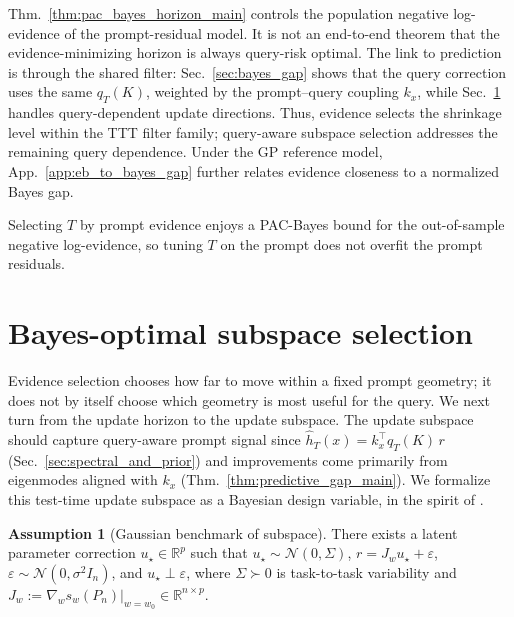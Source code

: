 \documentclass{article}
\theoremstyle{plain}
\theoremstyle{definition}
\newtheorem{assumption}[theorem]{Assumption}
\theoremstyle{remark}
\begin{document}
Thm.~\ref{thm:pac_bayes_horizon_main} controls the population negative log-evidence of the prompt-residual model. It is not an end-to-end theorem that the evidence-minimizing horizon is always query-risk optimal. The link to prediction is through the shared filter: Sec.~\ref{sec:bayes_gap} shows that the query correction uses the same $q_T(K)$, weighted by the prompt--query coupling $k_x$, while Sec.~\ref{sec:subspace_design} handles query-dependent update directions. Thus, evidence selects the shrinkage level within the TTT filter family; query-aware subspace selection addresses the remaining query dependence. Under the GP reference model, App.~\ref{app:eb_to_bayes_gap} further relates evidence closeness to a normalized Bayes gap.


\begin{takeawaybox}[title=\textbf{Takeaway (C2): per-prompt $T$ selection}]
Selecting $T$ by prompt evidence enjoys a PAC-Bayes bound for the out-of-sample negative log-evidence, so tuning $T$ on the prompt does not overfit the prompt residuals.
\end{takeawaybox}






\section{Bayes-optimal subspace selection}\label{sec:subspace_design}

Evidence selection chooses how far to move within a fixed prompt geometry; it does not by itself choose which geometry is most useful for the query. 
We next turn from the update horizon to the update subspace.
The update subspace should capture query-aware prompt signal since $\hat h_T(x)=k_x^\top q_T(K)\,r$ (Sec.~\ref{sec:spectral_and_prior}) and improvements come primarily from eigenmodes aligned with $k_x$ (Thm.~\ref{thm:predictive_gap_main}). We formalize this test-time update subspace as a Bayesian design variable, in the spirit of \citet{attia2018goal}.

\begin{assumption}[Gaussian benchmark of subspace]\label{assump:linear_gaussian_prior_sec8}
There exists a latent parameter correction $u_\star\in\mathbb{R}^p$ such that $u_\star \sim \mathcal{N}(0,\Sigma)$, $r = J_w u_\star + \varepsilon$, $\varepsilon\sim\mathcal{N}(0,\sigma^2 I_n)$, and $u_\star\perp \varepsilon$, where $\Sigma\succ 0$ is task-to-task variability and $J_w:=\nabla_w s_w(P_n)\vert_{w=w_0}\in\mathbb{R}^{n\times p}$.
\end{assumption}
\end{document}
